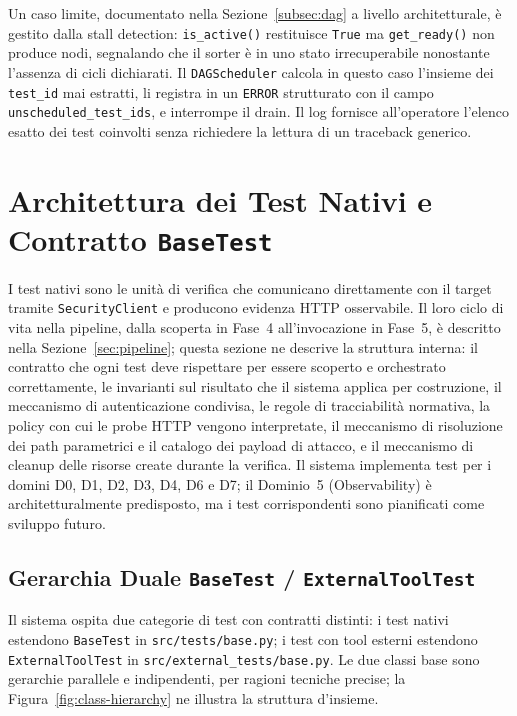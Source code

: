

Un caso limite, documentato nella Sezione~\ref{subsec:dag} a livello architetturale, è gestito dalla stall detection: \texttt{is\_active()} restituisce \texttt{True} ma \texttt{get\_ready()} non produce nodi, segnalando che il sorter è in uno stato irrecuperabile nonostante l'assenza di cicli dichiarati. Il \texttt{DAGScheduler} calcola in questo caso l'insieme dei \texttt{test\_id} mai estratti, li registra in un \texttt{ERROR} strutturato con il campo \texttt{unscheduled\_test\_ids}, e interrompe il drain. Il log fornisce all'operatore l'elenco esatto dei test coinvolti senza richiedere la lettura di un traceback generico.


\section{Architettura dei Test Nativi e Contratto \texttt{BaseTest}}%
\label{sec:basetest}

I test nativi sono le unità di verifica che comunicano direttamente con il target tramite \texttt{SecurityClient} e producono evidenza \gls{HTTP} osservabile. Il loro ciclo di vita nella pipeline, dalla scoperta in Fase~4 all'invocazione in Fase~5, è descritto nella Sezione~\ref{sec:pipeline}; questa sezione ne descrive la struttura interna: il contratto che ogni test deve rispettare per essere scoperto e orchestrato correttamente, le invarianti sul risultato che il sistema applica per costruzione, il meccanismo di autenticazione condivisa, le regole di tracciabilità normativa, la policy con cui le probe \gls{HTTP} vengono interpretate, il meccanismo di risoluzione dei path parametrici e il catalogo dei payload di attacco, e il meccanismo di cleanup delle risorse create durante la verifica. Il sistema implementa test per i domini D0, D1, D2, D3, D4, D6 e D7; il Dominio~5 (Observability) è architetturalmente predisposto, ma i test corrispondenti sono pianificati come sviluppo futuro.


\subsection{Gerarchia Duale \texttt{BaseTest} / \texttt{ExternalToolTest}}\label{subsec:dual-hierarchy}

Il sistema ospita due categorie di test con contratti distinti: i test nativi estendono \texttt{BaseTest} in \texttt{src/tests/base.py}; i test con tool esterni estendono \texttt{ExternalToolTest} in \texttt{src/external\_tests/base.py}. Le due classi base sono gerarchie parallele e indipendenti, per ragioni tecniche precise; la Figura~\ref{fig:class-hierarchy} ne illustra la struttura d'insieme.


